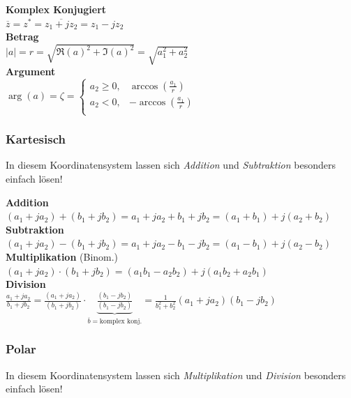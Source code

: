 \noindent\textbf{Komplex Konjugiert}\\
$\overline{z} = z^* = \overline{z_1 + jz_2} = z_1 - jz_2$\\

\noindent\textbf{Betrag}\\
$\left|a\right| = r = \sqrt{\Re(a)^2 + \Im(a)^2} = \sqrt{a_1^2 + a_2^2} $\\

\noindent\textbf{Argument}\\
$\arg(a) = \zeta = \left\{\begin{array}{ll}
	a_2 \geq 0 ,& \arccos\left(\frac{a_1}{r}\right) \\
	a_2 < 0 ,& -\arccos\left(\frac{a_1}{r}\right) \\
\end{array}\right.$\\


\subsubsection{Kartesisch}
In diesem Koordinatensystem lassen sich \textit{Addition} und \textit{Subtraktion} besonders einfach lösen!

\noindent\textbf{Addition}\\
$(a_1 + ja_2) + (b_1 + jb_2) = a_1 + ja_2 + b_1 + jb_2 = (a_1 + b_1) + j(a_2 + b_2)$\\

\noindent\textbf{Subtraktion}\\
$(a_1 + ja_2) - (b_1 + jb_2) = a_1 + ja_2 - b_1 - jb_2 = (a_1 - b_1) + j(a_2 - b_2)$\\

\noindent\textbf{Multiplikation} (Binom.)\\
$(a_1 + ja_2) \cdot (b_1 + jb_2) = (a_1b_1 - a_2b_2) + j(a_1b_2 + a_2b_1)$\\

\noindent\textbf{Division}\\
$\frac{a_1 + ja_2}{b_1 + jb_2} = \frac{(a_1 + ja_2)}{(b_1 + jb_2)} \cdot \underbrace{\frac{(b_1 - jb_2)}{(b_1 - jb_2)}}_{\overline{b} = \text{komplex konj.}} = \frac{1}{b_1^2 + b_2^2}(a_1+ja_2)(b_1 - jb_2)$\\

\subsubsection{Polar}
In diesem Koordinatensystem lassen sich \textit{Multiplikation} und \textit{Division} besonders einfach lösen!

